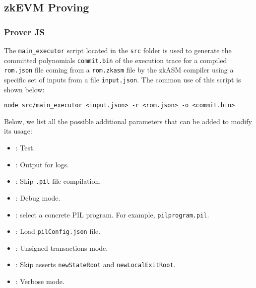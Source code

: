 \subsection{zkEVM Proving}


\subsubsection{Prover JS}

The \texttt{main\_executor} script located in the \texttt{src} folder is used to generate the committed polynomials \texttt{commit.bin} of the execution trace for a compiled \texttt{rom.json} file coming from a \texttt{rom.zkasm} file by the zkASM compiler using a specific set of inputs from a file \texttt{input.json}. The common use of this script is shown below:

\begin{lstlisting}[style=termt]
node src/main_executor <input.json> -r <rom.json> -o <commit.bin>
\end{lstlisting}

Below, we list all the possible additional parameters that can be added to modify its usage:

\begin{itemize}


\item {}: Test.

\item {}: Output for logs.

\item {}: Skip \texttt{.pil} file compilation.

\item {}: Debug mode.

\item {}: select a concrete PIL program. For example, \texttt{pilprogram.pil}.

\item {}: Load \texttt{pilConfig.json} file.

\item {}: Unsigned transactions mode.

\item {}: Skip asserts \texttt{newStateRoot} and \texttt{newLocalExitRoot}.

\item {}: Verbose mode.


\end{itemize}


